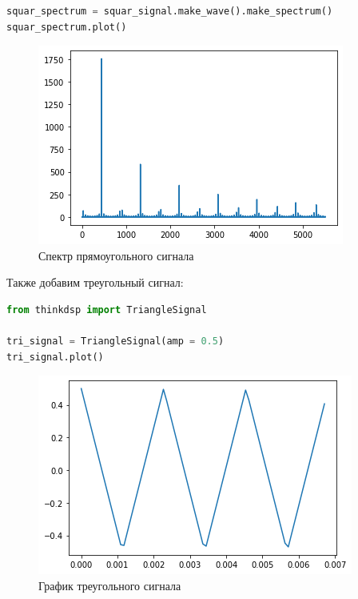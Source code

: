 \begin{lstlisting}[language=Python]
squar_spectrum = squar_signal.make_wave().make_spectrum()
squar_spectrum.plot()
\end{lstlisting}

\begin{figure}[H]
	\begin{center}
		\includegraphics[scale=1]{fig/lab02/lab02_10_0.png}
		\caption{Спектр прямоугольного сигнала}
	\end{center}
\end{figure}

Также добавим треугольный сигнал:

\begin{lstlisting}[language=Python]
from thinkdsp import TriangleSignal

tri_signal = TriangleSignal(amp = 0.5)
tri_signal.plot()
\end{lstlisting}

\begin{figure}[H]
	\begin{center}
		\includegraphics[scale=1]{fig/lab02/lab02_12_0.png}
		\caption{График треугольного сигнала}
	\end{center}
\end{figure}

